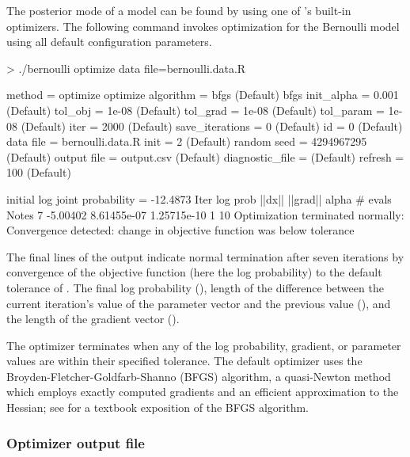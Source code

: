\documentclass[article]{jss}
\begin{document}
The posterior mode of a model can be found by using one of
's built-in optimizers.  The following command invokes
optimization for the Bernoulli model using all default configuration
parameters.
%
\begin{CodeChunk}
\begin{CodeInput}
> ./bernoulli optimize data file=bernoulli.data.R 
\end{CodeInput}
\begin{CodeOutput}
 method = optimize
   optimize
     algorithm = bfgs (Default)
       bfgs
         init_alpha = 0.001 (Default)
         tol_obj = 1e-08 (Default)
         tol_grad = 1e-08 (Default)
         tol_param = 1e-08 (Default)
     iter = 2000 (Default)
     save_iterations = 0 (Default)
 id = 0 (Default)
 data
   file = bernoulli.data.R
 init = 2 (Default)
 random
   seed = 4294967295 (Default)
 output
   file = output.csv (Default)
   diagnostic_file =  (Default)
   refresh = 100 (Default)

initial log joint probability = -12.4873
    Iter      log prob        ||dx||      ||grad||       alpha  # evals  Notes 
       7      -5.00402   8.61455e-07   1.25715e-10           1       10   
Optimization terminated normally: 
  Convergence detected: change in objective function was below
  tolerance
\end{CodeOutput}
\end{CodeChunk}
%
The final lines of the output indicate normal termination after seven
iterations by convergence of the objective function (here the log
probability) to the default tolerance of . The final log
probability (), length of the difference between the
current iteration's value of the parameter vector and the previous
value (), and the length of the gradient vector
().

The optimizer terminates when any of the log probability, gradient, or
parameter values are within their specified tolerance.  The default
optimizer uses the Broyden-Fletcher-Goldfarb-Shanno (BFGS) algorithm,
a quasi-Newton method which employs exactly computed gradients and an
efficient approximation to the Hessian; see \citep{NocedalWright:2006}
for a textbook exposition of the BFGS algorithm.

\subsubsection{Optimizer output file}
\end{document}

